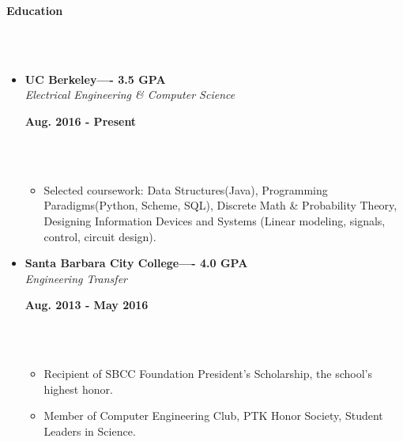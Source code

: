 \documentclass[a4paper,11pt]{article}
\newcommand{\isep}{-2 pt}
\newcommand{\lsep}{-0.2cm}
\newcommand{\resheading}[1]{{\small \colorbox{mygrey}{\begin{minipage}{0.975\textwidth}{\textbf{#1 \vphantom{p\^{E}}}}\end{minipage}}}}
\newcommand{\workexp}[4]{
\begin{minipage}[t]{7cm}
\begin{flushleft}
\textbf{#1} \\
\indent \emph{#2}\\
\end{flushleft}
\end{minipage}
\hfill
\begin{minipage}[t]{7cm}
\begin{flushright}
\textbf{#3} \\
\indent #4 \\
\end{flushright}
\end{minipage}
}
\begin{document}
\resheading{\textbf{Education} }\\[\lsep]
\\[-0.5cm]
\begin{itemize}
\item 
\workexp{UC Berkeley---- 3.5 GPA}{Electrical Engineering \& Computer Science}{Aug. 2016 - Present}{}
\\[-0.3cm]
	\begin{itemize}\itemsep \isep
	\item Selected coursework: Data Structures(Java), Programming Paradigms(Python, Scheme, SQL), Discrete Math \& Probability Theory, Designing Information Devices and Systems (Linear modeling, signals, control, circuit design).
	\end{itemize}
\end{itemize}
\begin{itemize}
\item 
\workexp{Santa Barbara City College---- 4.0 GPA}{Engineering Transfer}{Aug. 2013 - May 2016}{}
\\[-0.3cm]
	\begin{itemize}\itemsep \isep
	\item Recipient of SBCC Foundation President's Scholarship, the school's highest honor.
	\item Member of Computer Engineering Club, PTK Honor Society, Student Leaders in Science.
	\end{itemize}
\end{itemize}




\end{document}
